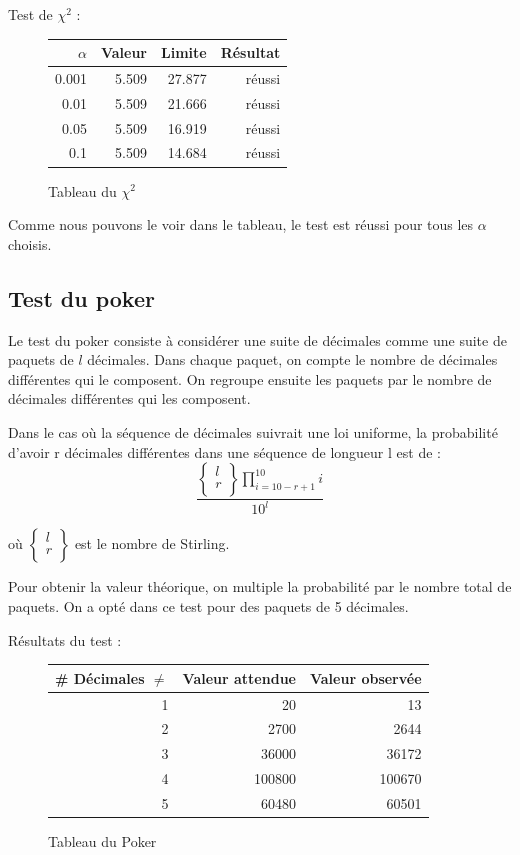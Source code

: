 \documentclass[10pt,a4paper]{article}
\begin{document}
	\newpage
	Test de $\chi^2$ :
	\begin{figure}[h]
		\centering
		\begin{tabular}{|r|r|r|r|}
			\hline
			$\alpha$ & Valeur & Limite & Résultat\\
			\hline
			0.001 & 5.509 & 27.877 & réussi\\
			0.01 & 5.509 & 21.666 & réussi\\
			0.05 & 5.509 & 16.919 & réussi\\
			0.1 & 5.509 & 14.684 & réussi\\
			\hline
		\end{tabular}
		\caption{Tableau du $\chi^2$}
	\end{figure}
	
	Comme nous pouvons le voir dans le tableau, le test est réussi pour tous les $\alpha$ choisis.
	
	\newpage
	\subsection{Test du poker}
	
	Le test du poker consiste à considérer une suite de décimales comme une suite de paquets de $l$ décimales. Dans chaque paquet, on compte le nombre de décimales différentes qui le composent. On regroupe ensuite les paquets par le nombre de décimales différentes qui les composent.
	
	Dans le cas où la séquence de décimales suivrait une loi uniforme, la probabilité d'avoir r décimales différentes dans une séquence de longueur l est de :
	\[
		\frac{
			\left\{
				\begin{array}{l}
					l\\
					r\\
				\end{array}
			\right\}
			\prod_{i=10-r+1}^{10}i
		}{10^l}
	\]
	
	où $\left\{
	\begin{array}{l}
	l\\
	r\\
	\end{array}
	\right\}$ est le nombre de Stirling.
	
	 Pour obtenir la valeur théorique, on multiple la probabilité par le nombre total de paquets. On a opté dans ce test pour des paquets de 5 décimales.
	
	Résultats du test :
	\begin{figure}[h]
		\centering
		\begin{tabular}{|r|r|r|}
			\hline
			\# Décimales $\ne$ & Valeur attendue & Valeur observée\\
			\hline
			1 & 20 & 13\\
			2 & 2700 & 2644\\
			3 & 36000 & 36172\\
			4 & 100800 & 100670\\
			5 & 60480 & 60501\\
			\hline
		\end{tabular}
		\caption{Tableau du Poker}
	\end{figure}
	
\end{document}
